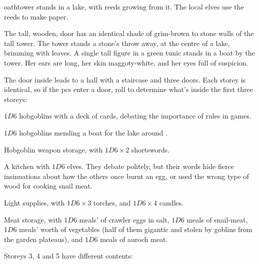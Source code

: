 \begin{multicols}{2}

\Gls{oathtower} stands in a lake, with reeds growing from it.
The local elves use the reeds to make paper.

\begin{boxtext}
  The tall, wooden, door has an identical shade of grim-brown to stone walls of the tall tower.
  The tower stands a stone's throw away, at the centre of a lake, brimming with leaves.
  A single tall figure in a green tunic stands in a boat by the tower.
  Her ears are long, her skin maggoty-white, and her eyes full of suspicion.
\end{boxtext}

The door inside leads to a hall with a staircase and three doors.
Each storey is identical, so if the \glspl{pc} enter a door, roll to determine what's inside the first three storeys:

\begin{dlist}
  \item
  $1D6$ hobgoblins with a deck of cards, debating the importance of rules in games.
  \item
  $1D6$ hobgoblins mending a boat for the lake around .
  \item
  Hobgoblin weapon storage, with $1D6 \times 2$ shortswords.
  \item
  A kitchen with $1D6$ elves.
  They debate politely, but their words hide fierce insinuations about how the others once burnt an egg, or used the wrong type of wood for cooking snail meat.
  \item
  Light supplies, with $1D6 \times 3$ torches, and $1D6 \times 4$ candles.
  \item
  Meat storage, with $1D6$ meals' of \gls{crawler} eggs in salt, $1D6$ meals of snail-meat, $1D6$ meals' worth of vegetables (half of them gigantic and stolen by goblins from the garden plateaus), and $1D6$ meals of auroch meat.
\end{dlist}

\hobgoblin

Storeys 3, 4 and 5 have different contents:


\end{multicols}
